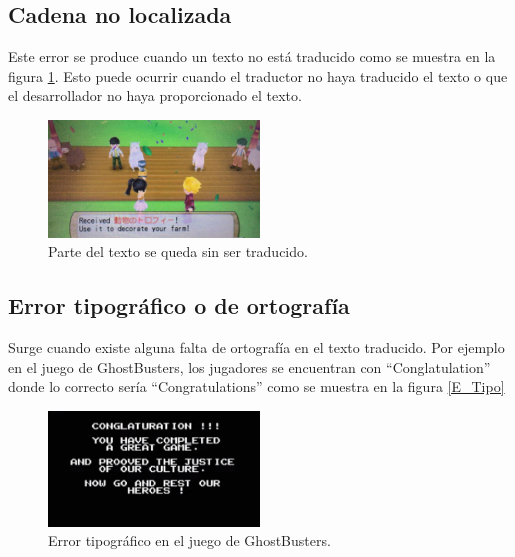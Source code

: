 \subsection{Cadena no localizada}\label{ErrorNoLocalizada}
Este error se produce cuando un texto no está traducido como se muestra en la figura \ref{fig:EImplementacion_Incorrecta}. Esto puede ocurrir cuando el traductor no haya traducido el texto o que el desarrollador no haya proporcionado el texto. 
\begin{figure}[H]
	\centering
	\includegraphics[width = 0.5\textwidth]{Imagenes/Errores_Localizacion/E_Implementacion_Incorrecta.png}
	\caption{Parte del texto se queda sin ser traducido.}
	\label{fig:EImplementacion_Incorrecta}
\end{figure}

\subsection{Error tipográfico o de ortografía}\label{ErrorTypo}
Surge cuando existe alguna falta de ortografía en el texto traducido. Por ejemplo en el juego de GhostBusters, los jugadores se encuentran con ``Conglatulation'' donde lo correcto sería ``Congratulations'' como se muestra en la figura \ref{E_Tipo}
\begin{figure}[H]
	\centering
	\includegraphics[width = 0.5\textwidth]{Imagenes/Errores_Localizacion/E_Tipo.png}
	\caption{Error tipográfico en el juego de GhostBusters.}
	\label{fig:E_Tipo}
\end{figure}
